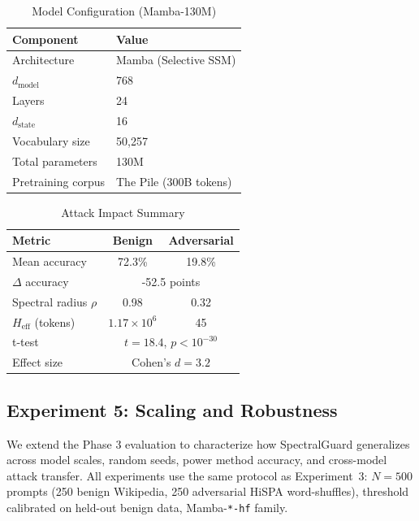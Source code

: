 \documentclass[10pt,twocolumn]{article}
\begin{document}
\begin{table}[t]
\centering
\caption{Model Configuration (Mamba-130M)}
\label{tab:model_config}
\small
\begin{tabular}{ll}
\toprule
\textbf{Component} & \textbf{Value} \\
\midrule
Architecture & Mamba (Selective SSM) \\
$d_{\text{model}}$ & 768 \\
Layers & 24 \\
$d_{\text{state}}$ & 16 \\
Vocabulary size & 50,257 \\
Total parameters & 130M \\
Pretraining corpus & The Pile (300B tokens) \\
\bottomrule
\end{tabular}
\end{table}

\begin{table}[t]
\centering
\caption{Attack Impact Summary}
\label{tab:attack_impact}
\small
\begin{tabular}{lcc}
\toprule
\textbf{Metric} & \textbf{Benign} & \textbf{Adversarial} \\
\midrule
Mean accuracy & 72.3\% & 19.8\% \\
$\Delta$ accuracy & \multicolumn{2}{c}{-52.5 points} \\
Spectral radius $\rho$ & 0.98 & 0.32 \\
$H_{\text{eff}}$ (tokens) & $1.17 \times 10^6$ & 45 \\
t-test & \multicolumn{2}{c}{$t=18.4$, $p<10^{-30}$} \\
Effect size & \multicolumn{2}{c}{Cohen's $d=3.2$} \\
\bottomrule
\end{tabular}
\end{table}

\subsection{Experiment 5: Scaling and Robustness} %
\label{sec:exp5}

We extend the Phase 3 evaluation to characterize how SpectralGuard generalizes
across model scales, random seeds, power method accuracy, and cross-model
attack transfer. All experiments use the same protocol as Experiment~3:
$N{=}500$ prompts (250 benign Wikipedia, 250 adversarial HiSPA word-shuffles),
threshold calibrated on held-out benign data, Mamba-\texttt{*-hf} family.
\end{document}
